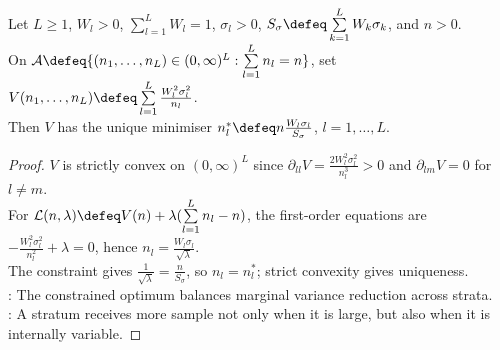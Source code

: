 \begin{theorem} \label{thm:neyman-allocation} \\
Let $L\geq1$, $W_l>0$, $\sum\limits_{l=1}^{L}W_l=1$, $\sigma_l>0$, $S_\sigma\defeq\sum\limits_{k=1}^{L}W_k\sigma_k$, and $n>0$.\\
On $\mathcal{A}\defeq\{(n_1,\ldots,n_L)\in(0,\infty)^L:\sum\limits_{l=1}^{L}n_l=n\}$, set $V(n_1,\ldots,n_L)\defeq\sum\limits_{l=1}^{L}\frac{W_l^2\sigma_l^2}{n_l}$.\\
Then $V$ has the unique minimiser $n_l^\ast\defeq n\frac{W_l\sigma_l}{S_\sigma}$, $l=1,\ldots,L$.
\begin{proof}
$V$ is strictly convex on $(0,\infty)^L$ since $\partial_{ll}V=\frac{2W_l^2\sigma_l^2}{n_l^3}>0$ and $\partial_{lm}V=0$ for $l\neq m$.\\
For $\mathcal{L}(n,\lambda)\defeq V(n)+\lambda(\sum\limits_{l=1}^{L}n_l-n)$, the first-order equations are $-\frac{W_l^2\sigma_l^2}{n_l^2}+\lambda=0$, hence $n_l=\frac{W_l\sigma_l}{\sqrt{\lambda}}$.\\
The constraint gives $\frac{1}{\sqrt{\lambda}}=\frac{n}{S_\sigma}$, so $n_l=n_l^\ast$; strict convexity gives uniqueness.\\
: The constrained optimum balances marginal variance reduction across strata.\\
: A stratum receives more sample not only when it is large, but also when it is internally variable.
\end{proof}
\end{theorem}

